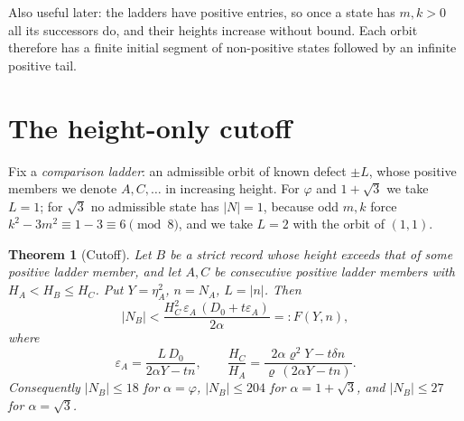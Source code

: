 \documentclass[11pt]{article}
\newtheorem{theorem}{Theorem}[section]
\theoremstyle{definition}
\theoremstyle{remark}
\newcommand{\pr}{\varrho}
\begin{document}
Also useful later: the ladders have positive entries, so once a state has $m,k>0$ all its
successors do, and their heights increase without bound. Each orbit therefore has a finite
initial segment of non-positive states followed by an infinite positive tail.

\section{The height-only cutoff}\label{sec:cutoff}

Fix a \emph{comparison ladder}: an admissible orbit of known defect $\pm L$, whose positive
members we denote $A,C,\dots$ in increasing height. For $\varphi$ and $1+\sqrt3$ we take
$L=1$; for $\sqrt3$ no admissible state has $|N|=1$, because odd $m,k$ force
$k^2-3m^2\equiv1-3\equiv6\pmod 8$, and we take $L=2$ with the orbit of $(1,1)$.

\begin{theorem}[Cutoff]\label{thm:cutoff}
Let $B$ be a strict record whose height exceeds that of some positive ladder member, and let
$A,C$ be consecutive positive ladder members with $H_A<H_B\le H_C$. Put $Y=\eta_A^2$, $n=N_A$,
$L=|n|$. Then
\begin{equation}\label{eq:F}
|N_B|<\frac{H_C^2\,\varepsilon_A\,(D_0+t\varepsilon_A)}{2\alpha}=:F(Y,n),
\end{equation}
where
\[
\varepsilon_A=\frac{L\,D_0}{2\alpha Y-tn},\qquad
\frac{H_C}{H_A}=\frac{2\alpha \pr^2 Y-t\delta n}{\pr\,(2\alpha Y-tn)} .
\]
Consequently $|N_B|\le 18$ for $\alpha=\varphi$, $|N_B|\le204$ for $\alpha=1+\sqrt3$, and
$|N_B|\le27$ for $\alpha=\sqrt3$.
\end{theorem}
\end{document}
